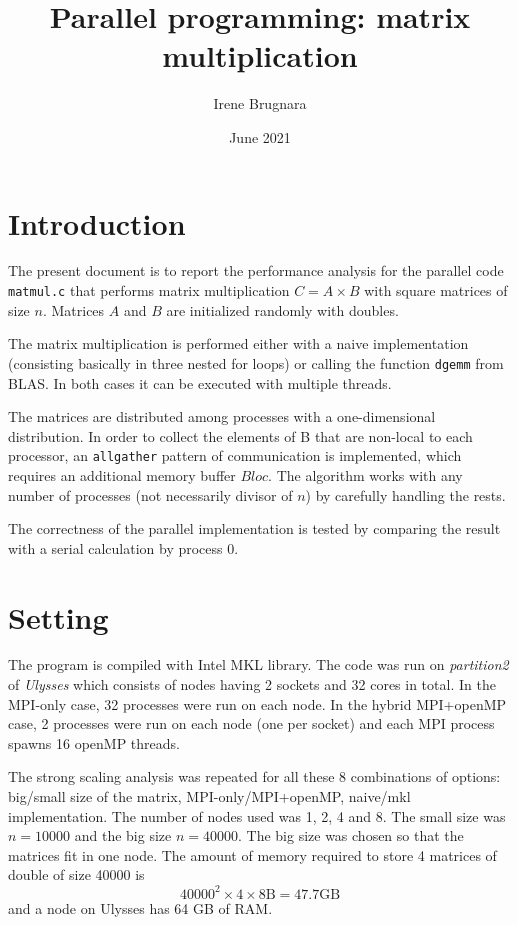 \documentclass[12pt]{extarticle}
\title{Parallel programming: matrix multiplication}
\author{Irene Brugnara}
\date{June 2021}
\begin{document}
	
	\maketitle
	
	
\section*{Introduction}

The present document is to report the performance analysis for the parallel code \texttt{matmul.c} that performs matrix multiplication $C=A \times B$ with square matrices of size $n$. Matrices $A$ and $B$ are initialized randomly with doubles.

The matrix multiplication is performed either with a naive implementation (consisting basically in three nested for loops) or calling the function \texttt{dgemm} from BLAS.
In both cases it can be executed with multiple threads.

The matrices are distributed among processes with a one-dimensional distribution. In order to collect the elements of B that are non-local to each processor, an \texttt{allgather} pattern of communication is implemented, which requires an additional memory buffer $Bloc$. The algorithm works with any number of processes (not necessarily divisor of $n$) by carefully handling the rests.



The correctness of the parallel implementation is tested by comparing the result with a serial calculation by process 0.


\section*{Setting}

The program is compiled with Intel MKL library. The code was run on \textit{partition2} of \textit{Ulysses} which consists of nodes having 2 sockets and 32 cores in total. 
In the MPI-only case, 32 processes were run on each node.
In the hybrid MPI+openMP case, 2 processes were run on each node (one per socket) and each MPI process spawns 16 openMP threads.

The strong scaling analysis was repeated for all these 8 combinations of options: big/small size of the matrix, MPI-only/MPI+openMP, naive/mkl implementation. The number of nodes used was 1, 2, 4 and 8.
The small size was $n=10000$ and the big size $n=40000$.
The big size was chosen so that the matrices fit in one node. The amount of memory required to store 4 matrices of double of size 40000 is
\[ 40000^2 \times 4 \times 8 \mathrm{B} = 47.7  \mathrm{GB} \]
and a node on Ulysses has 64 GB of RAM.
\end{document}
